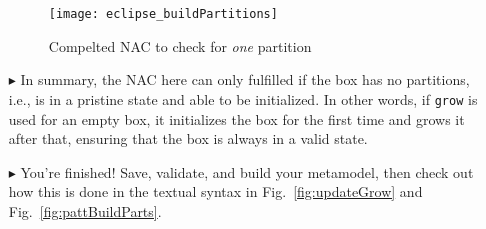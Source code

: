 \begin{itemize}
\newpage
 
\begin{figure}[htp]
\begin{center}
  \texttt{[image: eclipse\_buildPartitions]}
  \caption{Compelted NAC to check for \emph{one} partition}
  \label{fig:buildPartitions}
\end{center}
\end{figure}
 
\item[$\blacktriangleright$] In summary, the NAC here can only fulfilled if the box has no partitions, i.e., is in a pristine state and able to be initialized.
In other words, if \texttt{grow} is used for an empty box, it initializes the box for the first time and grows it after that, ensuring that the box is always in
a valid state.
 
\item[$\blacktriangleright$] You're finished! Save, validate, and build your metamodel, then check out how this is done in the textual syntax in
Fig.~\ref{fig:updateGrow} and Fig.~\ref{fig:pattBuildParts}.


\end{itemize}
